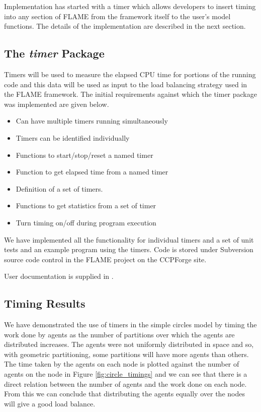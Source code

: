 Implementation has started with a timer which allows developers to insert timing into any section of FLAME from the framework itself to the user's model functions. The details of the implementation are described in the next section.

\subsection{The \textit{timer} Package}

Timers will be used to measure the elapsed CPU time for portions of the running code and this data will be used as input to the load balancing strategy used in the FLAME framework. The initial requirements against which the timer package was implemented are given below.

\begin{itemize}
\item Can have multiple timers running simultaneously
\item Timers can be identified individually
\item Functions to start/stop/reset a named timer
\item Function to get elapsed time from a named timer
\item Definition of a set of timers.
\item Functions to get statistics from a set of timer
\item Turn timing on/off during program execution 
\end{itemize}

We have implemented all the functionality for individual timers and a set of unit tests and an example program using the timers. Code is stored under Subversion source code control in the FLAME project on the CCPForge site. 

User documentation is supplied in \cite{TimerAPI}.

\subsection{Timing Results}

We have demonstrated the use of timers in the simple circles model by timing the work done by agents as the number of partitions over which the agents are distributed increases. The agents were not uniformly distributed in space and so, with geometric partitioning, some partitions will have more agents than others. The time taken by the agents on each node is plotted against the number of agents on the node in Figure \ref{fig:circle_timings} and we can see that there is a direct relation between the number of agents and the work done on each node. From this we can conclude that distributing the agents equally over the nodes will give a good load balance.

